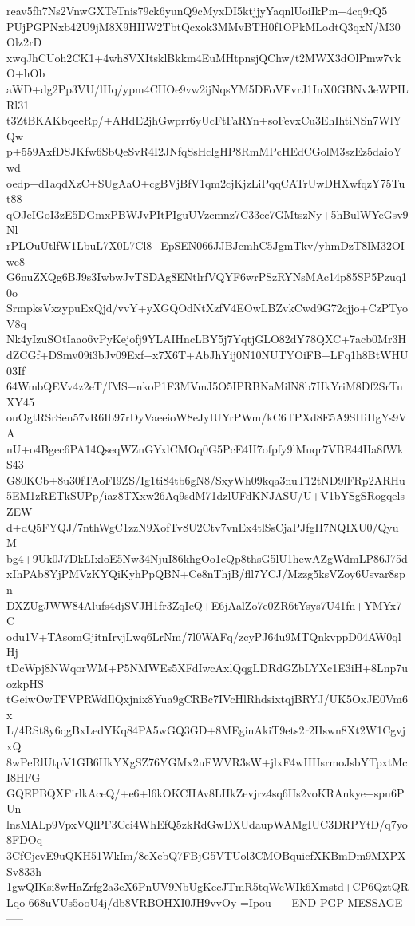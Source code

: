 reav5fh7Ns2VnwGXTeTnis79ck6yunQ9cMyxDI5ktjjyYaqnlUoiIkPm+4cq9rQ5
PUjPGPNxb42U9jM8X9HIIW2TbtQcxok3MMvBTH0f1OPkMLodtQ3qxN/M30Olz2rD
xwqJhCUoh2CK1+4wh8VXItsklBkkm4EuMHtpnsjQChw/t2MWX3dOlPmw7vkO+hOb
aWD+dg2Pp3VU/lHq/ypm4CHOe9vw2ijNqsYM5DFoVEvrJ1InX0GBNv3eWPILRl31
t3ZtBKAKbqeeRp/+AHdE2jhGwprr6yUcFtFaRYn+soFevxCu3EhIhtiNSn7WlYQw
p+559AxfDSJKfw6SbQeSvR4I2JNfqSsHclgHP8RmMPcHEdCGolM3szEz5daioYwd
oedp+d1aqdXzC+SUgAaO+cgBVjBfV1qm2cjKjzLiPqqCATrUwDHXwfqzY75Tut88
qOJeIGoI3zE5DGmxPBWJvPItPIguUVzcmnz7C33ec7GMtszNy+5hBulWYeGsv9Nl
rPLOuUtlfW1LbuL7X0L7Cl8+EpSEN066JJBJcmhC5JgmTkv/yhmDzT8lM32OIwe8
G6nuZXQg6BJ9s3IwbwJvTSDAg8ENtlrfVQYF6wrPSzRYNsMAc14p85SP5Pzuq10o
SrmpksVxzypuExQjd/vvY+yXGQOdNtXzfV4EOwLBZvkCwd9G72cjjo+CzPTyoV8q
Nk4yIzuSOtIaao6vPyKejofj9YLAIHncLBY5j7YqtjGLO82dY78QXC+7acb0Mr3H
dZCGf+DSmv09i3bJv09Exf+x7X6T+AbJhYij0N10NUTYOiFB+LFq1h8BtWHU03If
64WmbQEVv4z2eT/fMS+nkoP1F3MVmJ5O5IPRBNaMilN8b7HkYriM8Df2SrTnXY45
ouOgtRSrSen57vR6Ib97rDyVaeeioW8eJyIUYrPWm/kC6TPXd8E5A9SHiHgYs9VA
nU+o4Bgec6PA14QseqWZnGYxlCMOq0G5PcE4H7ofpfy9lMuqr7VBE44Ha8fWkS43
G80KCb+8u30fTAoFI9ZS/Ig1ti84tb6gN8/SxyWh09kqa3nuT12tND9lFRp2ARHu
5EM1zRETkSUPp/iaz8TXxw26Aq9sdM71dzlUFdKNJASU/U+V1bYSgSRogqelsZEW
d+dQ5FYQJ/7nthWgC1zzN9XofTv8U2Ctv7vnEx4tlSsCjaPJfgII7NQIXU0/QyuM
bg4+9Uk0J7DkLIxloE5Nw34NjuI86khgOo1cQp8thsG5lU1hewAZgWdmLP86J75d
xIhPAb8YjPMVzKYQiKyhPpQBN+Ce8nThjB/fll7YCJ/Mzzg5ksVZoy6Usvar8spn
DXZUgJWW84Alufs4djSVJH1fr3ZqIeQ+E6jAalZo7e0ZR6tYsys7U41fn+YMYx7C
odu1V+TAsomGjitnIrvjLwq6LrNm/7l0WAFq/zcyPJ64u9MTQnkvppD04AW0qlHj
tDcWpj8NWqorWM+P5NMWEs5XFdIwcAxlQqgLDRdGZbLYXc1E3iH+8Lnp7uozkpHS
tGeiwOwTFVPRWdIlQxjnix8Yua9gCRBc7IVcHlRhdsixtqjBRYJ/UK5OxJE0Vm6x
L/4RSt8y6qgBxLedYKq84PA5wGQ3GD+8MEginAkiT9ets2r2Hswn8Xt2W1CgvjxQ
8wPeRlUtpV1GB6HkYXgSZ76YGMx2uFWVR3sW+jlxF4wHHsrmoJsbYTpxtMcI8HFG
GQEPBQXFirlkAceQ/+e6+l6kOKCHAv8LHkZevjrz4sq6Hs2voKRAnkye+spn6PUn
lnsMALp9VpxVQlPF3Cci4WhEfQ5zkRdGwDXUdaupWAMgIUC3DRPYtD/q7yo8FDOq
3CfCjcvE9uQKH51WkIm/8eXebQ7FBjG5VTUol3CMOBquicfXKBmDm9MXPXSv833h
1gwQIKsi8wHaZrfg2a3eX6PnUV9NbUgKecJTmR5tqWcWIk6Xmstd+CP6QztQRLqo
668uVUs5ooU4j/db8VRBOHXI0JH9vvOy
=Ipou
-----END PGP MESSAGE-----
